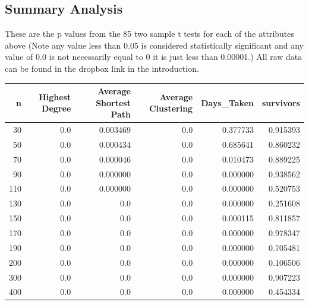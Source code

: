 \documentclass{article}
\begin{document}
            \subsection{Summary Analysis}
            These are the p values from the 85 two sample t tests for each of the attributes above (Note any value less than 0.05 is considered statistically significant and any value of 0.0 is not necessarily equal to 0 it is just less than 0.00001.) All raw data can be found in the dropbox link in the introduction.
            \begin{tabular}{rrrrrr}
                \toprule
                  n &  Highest Degree &  Average Shortest Path &  Average Clustering &  Days\_Taken &  survivors \\
                \midrule
                 30 &             0.0 &               0.003469 &                 0.0 &    0.377733 &   0.915393 \\
                 50 &             0.0 &               0.000434 &                 0.0 &    0.685641 &   0.860232 \\
                 70 &             0.0 &               0.000046 &                 0.0 &    0.010473 &   0.889225 \\
                 90 &             0.0 &               0.000000 &                 0.0 &    0.000000 &   0.938562 \\
                110 &             0.0 &               0.000000 &                 0.0 &    0.000000 &   0.520753 \\
                130 &             0.0 &                    0.0 &                 0.0 &    0.000000 &   0.251608 \\
                150 &             0.0 &                    0.0 &                 0.0 &    0.000115 &   0.811857 \\
                170 &             0.0 &                    0.0 &                 0.0 &    0.000000 &   0.978347 \\
                190 &             0.0 &                    0.0 &                 0.0 &    0.000000 &   0.705481 \\
                200 &             0.0 &                    0.0 &                 0.0 &    0.000000 &   0.106506 \\
                300 &             0.0 &                    0.0 &                 0.0 &    0.000000 &   0.907223 \\
                400 &             0.0 &                    0.0 &                 0.0 &    0.000000 &   0.454334 \\

\end{tabular}
\end{document}
